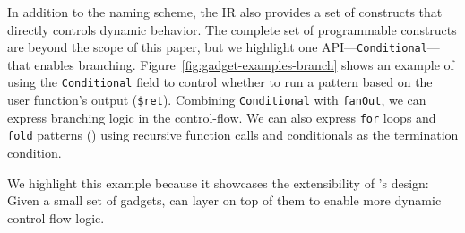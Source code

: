 In addition to the naming scheme, the IR also provides a set of constructs
that directly controls dynamic behavior. The complete set of programmable
constructs are beyond the scope of this paper, but we highlight one
API---\texttt{Conditional}--- that enables
branching. Figure~\ref{fig:gadget-examples-branch} shows an example of using
the \texttt{Conditional} field to control whether to run a pattern based on the
user function's output (\texttt{\$ret}). Combining \texttt{Conditional} with
\texttt{fanOut}, we can express branching logic in the control-flow. We can
	also express \texttt{for} loops and \texttt{fold} patterns () using recursive function calls and conditionals as the termination
	condition. 

We highlight this example because it showcases the extensibility of \name{}'s
design: Given a small set of gadgets, \name{} can layer on top of them to
enable more dynamic control-flow logic.

